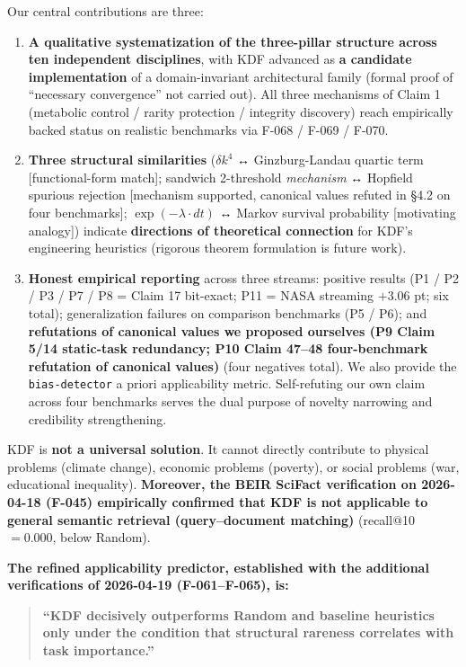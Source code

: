 Our central contributions are three:

\begin{enumerate}
\def\labelenumi{\arabic{enumi}.}
\tightlist
\item
  \textbf{A qualitative systematization of the three-pillar structure across ten independent disciplines}, with KDF advanced as \textbf{a candidate implementation} of a domain-invariant architectural family (formal proof of ``necessary convergence'' not carried out). All three mechanisms of Claim 1 (metabolic control / rarity protection / integrity discovery) reach empirically backed status on realistic benchmarks via F-068 / F-069 / F-070.
\item
  \textbf{Three structural similarities} (\(\delta k^4\) ↔ Ginzburg-Landau quartic term {[}functional-form match{]}; sandwich 2-threshold \emph{mechanism} ↔ Hopfield spurious rejection {[}mechanism supported, canonical values refuted in §4.2 on four benchmarks{]}; \(\exp(-\lambda \cdot dt)\) ↔ Markov survival probability {[}motivating analogy{]}) indicate \textbf{directions of theoretical connection} for KDF's engineering heuristics (rigorous theorem formulation is future work).
\item
  \textbf{Honest empirical reporting} across three streams: positive results (P1 / P2 / P3 / P7 / P8 = Claim 17 bit-exact; P11 = NASA streaming \(+3.06\) pt; six total); generalization failures on comparison benchmarks (P5 / P6); and \textbf{refutations of canonical values we proposed ourselves (P9 Claim 5/14 static-task redundancy; P10 Claim 47--48 four-benchmark refutation of canonical values)} (four negatives total). We also provide the \texttt{bias-detector} a priori applicability metric. Self-refuting our own claim across four benchmarks serves the dual purpose of novelty narrowing and credibility strengthening.
\end{enumerate}

KDF is \textbf{not a universal solution}. It cannot directly contribute to physical problems (climate change), economic problems (poverty), or social problems (war, educational inequality). \textbf{Moreover, the BEIR SciFact verification on 2026-04-18 (F-045) empirically confirmed that KDF is not applicable to general semantic retrieval (query--document matching)} (recall@10 \(= 0.000\), below Random).

\textbf{The refined applicability predictor, established with the additional verifications of 2026-04-19 (F-061--F-065), is:}

\begin{quote}
\textbf{``KDF decisively outperforms Random and baseline heuristics only under the condition that structural rareness correlates with task importance.''}
\end{quote}

